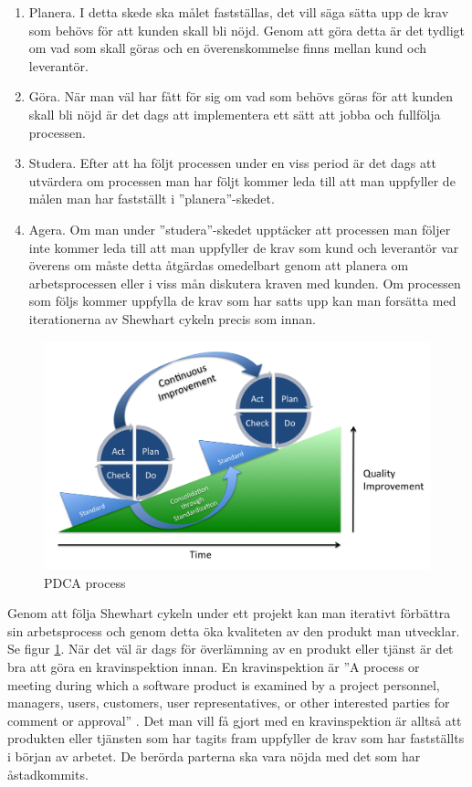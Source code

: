 \begin{enumerate}
  \item Planera. I detta skede ska målet fastställas, det vill säga sätta upp de krav som behövs för att kunden skall bli nöjd. Genom att göra detta är det tydligt om vad som skall göras och en överenskommelse finns mellan kund och leverantör. 
  \item Göra. När man väl har fått för sig om vad som behövs göras för att kunden skall bli nöjd är det dags att implementera ett sätt att jobba och fullfölja processen.
  \item Studera. Efter att ha följt processen under en viss period är det dags att utvärdera om processen man har följt kommer leda till att man uppfyller de målen man har fastställt i ''planera''-skedet.
  \item Agera. Om man under ''studera''-skedet upptäcker att processen man följer inte kommer leda till att man uppfyller de krav som kund och leverantör var överens om måste detta åtgärdas omedelbart genom att planera om arbetsprocessen eller i viss mån diskutera kraven med kunden. Om processen som följs kommer uppfylla de krav som har satts upp kan man forsätta med iterationerna av Shewhart cykeln precis som innan.
\end{enumerate}

\begin{figure}[h]
\centerline{\includegraphics[scale=0.15]{ruben-tex/graphic/PDCA_Process}}
\caption{PDCA process}
\label{fig:pdcaprocess}
\end{figure}

\noindent Genom att följa Shewhart cykeln under ett projekt kan man iterativt förbättra sin arbetsprocess och genom detta öka kvaliteten av den produkt man utvecklar. Se figur \ref{fig:pdcaprocess}.
\newline
\newline
När det väl är dags för överlämning av en produkt eller tjänst är det bra att göra en kravinspektion innan. En kravinspektion är ''A process or meeting during which a software product is examined by a project personnel, managers, users, customers, user representatives, or other interested parties for comment or approval'' \cite{SFSR}. Det man vill få gjort med en kravinspektion är alltså att produkten eller tjänsten som har tagits fram uppfyller de krav som har fastställts i början av arbetet. De berörda parterna ska vara nöjda med det som har åstadkommits.




